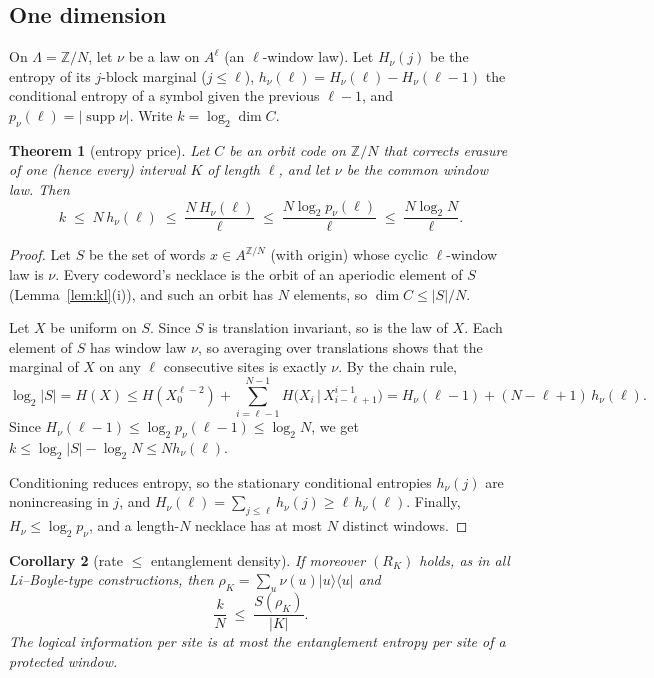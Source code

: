 \documentclass[11pt]{article}
\newtheorem{theorem}{Theorem}[section]
\newtheorem{corollary}[theorem]{Corollary}
\theoremstyle{definition}
\theoremstyle{remark}
\newcommand{\Z}{\mathbb Z}
\newcommand{\supp}{\operatorname{supp}}
\begin{document}
\subsection{One dimension}
On $\Lambda=\Z/N$, let $\nu$ be a law on $A^\ell$ (an $\ell$-window law). Let $H_\nu(j)$ be the entropy of its $j$-block marginal ($j\le\ell$), $h_\nu(\ell)=H_\nu(\ell)-H_\nu(\ell-1)$ the conditional entropy of a symbol given the previous $\ell-1$, and $p_\nu(\ell)=|\supp\nu|$. Write $k=\log_2\dim C$.

\begin{theorem}[entropy price]\label{thm:price}
Let $C$ be an orbit code on $\Z/N$ that corrects erasure of one (hence every) interval $K$ of length $\ell$, and let $\nu$ be the common window law. Then
\[k\;\le\;N\,h_\nu(\ell)\;\le\;\frac{N\,H_\nu(\ell)}{\ell}\;\le\;\frac{N\log_2p_\nu(\ell)}{\ell}\;\le\;\frac{N\log_2N}{\ell}.\]
\end{theorem}

\begin{proof}
Let $S$ be the set of words $x\in A^{\Z/N}$ (with origin) whose cyclic $\ell$-window law is $\nu$. Every codeword's necklace is the orbit of an aperiodic element of $S$ (Lemma~\ref{lem:kl}(i)), and such an orbit has $N$ elements, so $\dim C\le|S|/N$.

Let $X$ be uniform on $S$. Since $S$ is translation invariant, so is the law of $X$. Each element of $S$ has window law $\nu$, so averaging over translations shows that the marginal of $X$ on any $\ell$ consecutive sites is exactly $\nu$. By the chain rule,
\[\log_2|S|=H(X)\le H(X_0^{\ell-2})+\sum_{i=\ell-1}^{N-1}H\big(X_i\,\big|\,X_{i-\ell+1}^{i-1}\big)=H_\nu(\ell-1)+(N-\ell+1)\,h_\nu(\ell).\]
Since $H_\nu(\ell-1)\le\log_2p_\nu(\ell-1)\le\log_2N$, we get $k\le\log_2|S|-\log_2N\le Nh_\nu(\ell)$.

Conditioning reduces entropy, so the stationary conditional entropies $h_\nu(j)$ are nonincreasing in $j$, and $H_\nu(\ell)=\sum_{j\le\ell}h_\nu(j)\ge\ell\,h_\nu(\ell)$. Finally, $H_\nu\le\log_2p_\nu$, and a length-$N$ necklace has at most $N$ distinct windows.
\end{proof}

\begin{corollary}[rate $\le$ entanglement density]\label{cor:ent}
If moreover $(R_K)$ holds, as in all Li--Boyle-type constructions, then $\rho_K=\sum_u\nu(u)|u\rangle\langle u|$ and
\[\frac kN\;\le\;\frac{S(\rho_K)}{|K|}.\]
The logical information per site is at most the entanglement entropy per site of a protected window.
\end{corollary}
\end{document}

